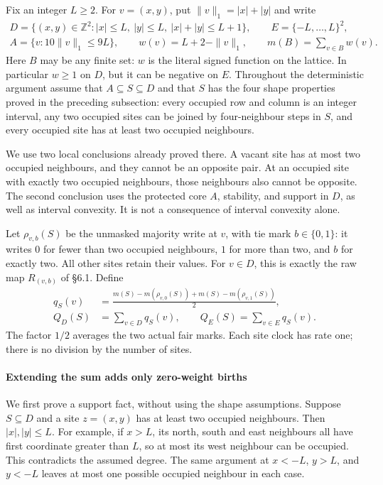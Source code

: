 \documentclass[
  11pt,
  a4paper,
]{article}
\begin{document}
Fix an integer \(L\geq2\). For \(v=(x,y)\), put \(\|v\|_1=|x|+|y|\) and
write \[
\begin{gathered}
D=\{(x,y)\in\mathbb Z^2:|x|\leq L,\ |y|\leq L,\ |x|+|y|\leq L+1\},
\qquad E=\{-L,\ldots,L\}^2,\\
A=\{v:10\|v\|_1\leq9L\},\qquad
w(v)=L+2-\|v\|_1,\qquad m(B)=\sum_{v\in B}w(v).
\end{gathered}
\tag{R2}
\] Here \(B\) may be any finite set: \(w\) is the literal signed
function on the lattice. In particular \(w\geq1\) on \(D\), but it can
be negative on \(E\). Throughout the deterministic argument assume that
\(A\subseteq S\subseteq D\) and that \(S\) has the four shape properties
proved in the preceding subsection: every occupied row and column is an
integer interval, any two occupied sites can be joined by four-neighbour
steps in \(S\), and every occupied site has at least two occupied
neighbours.

We use two local conclusions already proved there. A vacant site has at
most two occupied neighbours, and they cannot be an opposite pair. At an
occupied site with exactly two occupied neighbours, those neighbours
also cannot be opposite. The second conclusion uses the protected core
\(A\), stability, and support in \(D\), as well as interval convexity.
It is not a consequence of interval convexity alone.

Let \(\rho_{v,b}(S)\) be the unmasked majority write at \(v\), with tie
mark \(b\in\{0,1\}\): it writes \(0\) for fewer than two occupied
neighbours, \(1\) for more than two, and \(b\) for exactly two. All
other sites retain their values. For \(v\in D\), this is exactly the raw
map \(R_{(v,b)}\) of §6.1. Define \[
\begin{aligned}
q_S(v)&=\frac{m(S)-m(\rho_{v,0}(S))
                    +m(S)-m(\rho_{v,1}(S))}{2},\\
Q_D(S)&=\sum_{v\in D}q_S(v),\qquad Q_E(S)=\sum_{v\in E}q_S(v).
\end{aligned}
\tag{R3}
\] The factor \(1/2\) averages the two actual fair marks. Each site
clock has rate one; there is no division by the number of sites.

\paragraph{Extending the sum adds only zero-weight
births}\label{extending-the-sum-adds-only-zero-weight-births}

We first prove a support fact, without using the shape assumptions.
Suppose \(S\subseteq D\) and a site \(z=(x,y)\) has at least two
occupied neighbours. Then \(|x|,|y|\leq L\). For example, if \(x>L\),
its north, south and east neighbours all have first coordinate greater
than \(L\), so at most its west neighbour can be occupied. This
contradicts the assumed degree. The same argument at \(x<-L\), \(y>L\),
and \(y<-L\) leaves at most one possible occupied neighbour in each
case.
\end{document}
